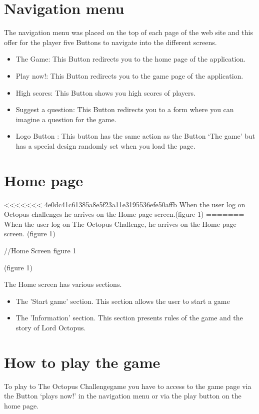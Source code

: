 \documentclass[a4paper,11pt, oneside]{book}
\def\appName{The Octopus Challenge}
\def\octopusName{Lord Octopus}
\begin{document}
	\section{Navigation menu}
	The navigation menu was placed on the top of each page of the web site and this offer for the player five Buttons to navigate into the different screens.
	\begin{itemize}
		\item The Game: This Button redirects you to the home page of the application.
		\item Play now!: This Button redirects you to the game page of the application.
		\item High scores: This Button shows you high scores of players.
		\item Suggest a question: This Button redirects you to a form where you can imagine a question for the game.
		\item Logo Button : This button has the same action as the Button ‘The game’ but has a special design randomly set when you load the page.
	\end{itemize}

	\section{Home page}
<<<<<<< 4e0dc41c61385a8e5f23a11e3195536efe50affb
	When the user log on Octopus challenges he arrives on the Home page screen.(figure 1)
=======
	When the user log on \appName, he arrives on the Home page screen.
(figure 1)

//Home Screen figure 1


(figure 1)

The Home screen has various sections.
\begin{itemize}
	\item The 'Start game' section. This section allows the user to start a game
	\item The 'Information' section. This section presents rules of the game and the story of \octopusName.
\end{itemize}


	\section{How to play the game}

	To play to \appName game you have to access to the game page via the Button ‘plays now!’ in the navigation menu or via the play button on the home page.
\end{document}
